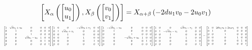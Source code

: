 \documentclass[11pt]{article}
\theoremstyle{definition}
\begin{document}
\[
\scaletoalign{\textwidth}{\left[ X_{\alpha}\left(\left[\begin{matrix}u_{0}\\u_{1}\end{matrix}\right]\right), X_{\beta}\left(\left[\begin{matrix}v_{0}\\v_{1}\end{matrix}\right]\right) \right] = X_{\alpha + \beta}\left(- 2 d u_{1} v_{0} - 2 u_{0} v_{1}\right)}
\]
\[
\scaletoalign{\textwidth}{{\left[\begin{matrix}1 & \sqrt{d} u_{1} + u_{0} & 0 & 0 & 0 & 0\\0 & 1 & 0 & 0 & 0 & 0\\0 & 0 & 1 & 0 & 0 & 0\\0 & 0 & \sqrt{d} u_{1} - u_{0} & 1 & 0 & 0\\0 & 0 & 0 & 0 & 1 & 0\\0 & 0 & 0 & 0 & 0 & 1\end{matrix}\right]} {\left[\begin{matrix}1 & 0 & 0 & - \sqrt{d} v_{0} + v_{1} & 0 & 0\\0 & 1 & \sqrt{d} v_{0} + v_{1} & 0 & 0 & 0\\0 & 0 & 1 & 0 & 0 & 0\\0 & 0 & 0 & 1 & 0 & 0\\0 & 0 & 0 & 0 & 1 & 0\\0 & 0 & 0 & 0 & 0 & 1\end{matrix}\right]} {\left[\begin{matrix}1 & - \sqrt{d} u_{1} - u_{0} & 0 & 0 & 0 & 0\\0 & 1 & 0 & 0 & 0 & 0\\0 & 0 & 1 & 0 & 0 & 0\\0 & 0 & - \sqrt{d} u_{1} + u_{0} & 1 & 0 & 0\\0 & 0 & 0 & 0 & 1 & 0\\0 & 0 & 0 & 0 & 0 & 1\end{matrix}\right]} {\left[\begin{matrix}1 & 0 & 0 & \sqrt{d} v_{0} - v_{1} & 0 & 0\\0 & 1 & - \sqrt{d} v_{0} - v_{1} & 0 & 0 & 0\\0 & 0 & 1 & 0 & 0 & 0\\0 & 0 & 0 & 1 & 0 & 0\\0 & 0 & 0 & 0 & 1 & 0\\0 & 0 & 0 & 0 & 0 & 1\end{matrix}\right]} = {\left[\begin{matrix}1 & 0 & 2 d u_{1} v_{0} + 2 u_{0} v_{1} & 0 & 0 & 0\\0 & 1 & 0 & 0 & 0 & 0\\0 & 0 & 1 & 0 & 0 & 0\\0 & 0 & 0 & 1 & 0 & 0\\0 & 0 & 0 & 0 & 1 & 0\\0 & 0 & 0 & 0 & 0 & 1\end{matrix}\right]}}
\]
\end{document}
